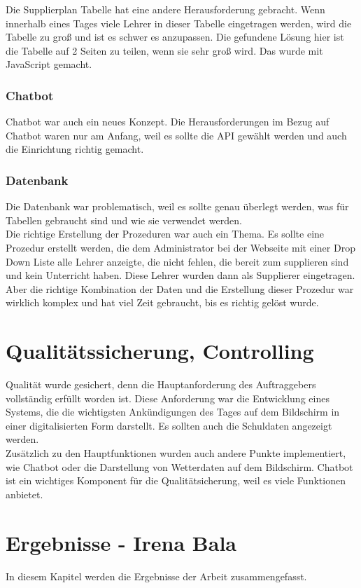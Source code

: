Die Supplierplan Tabelle hat eine andere Herausforderung gebracht. Wenn innerhalb eines Tages viele Lehrer in dieser Tabelle eingetragen werden, wird die Tabelle zu groß und ist es schwer es anzupassen. Die gefundene Lösung hier ist die Tabelle auf 2 Seiten zu teilen, wenn sie sehr groß wird. Das wurde mit JavaScript gemacht. 

\subsubsection{Chatbot}

Chatbot war auch ein neues Konzept. Die Herausforderungen im Bezug auf Chatbot waren nur am Anfang, weil es sollte die API gewählt werden und auch die Einrichtung richtig gemacht. 

\subsubsection{Datenbank}

Die Datenbank war problematisch, weil es sollte genau überlegt werden, was für Tabellen gebraucht sind und wie sie verwendet werden. \\
Die richtige Erstellung der Prozeduren war auch ein Thema. Es sollte eine Prozedur erstellt werden, die dem Administrator bei der Webseite mit einer Drop Down Liste alle Lehrer anzeigte, die nicht fehlen, die bereit zum supplieren sind und kein Unterricht haben. Diese Lehrer wurden dann als Supplierer eingetragen. Aber die richtige Kombination der Daten und die Erstellung dieser Prozedur war wirklich komplex und hat viel Zeit gebraucht, bis es richtig gelöst wurde. 
\section{Qualitätssicherung, Controlling}
Qualität wurde gesichert, denn die Hauptanforderung des Auftraggebers vollständig erfüllt worden ist. Diese Anforderung war die Entwicklung eines Systems, die die wichtigsten Ankündigungen des Tages auf dem Bildschirm in einer digitalisierten Form darstellt. Es sollten auch die Schuldaten angezeigt werden. \\
Zusätzlich zu den Hauptfunktionen wurden auch andere Punkte implementiert, wie Chatbot oder die Darstellung von Wetterdaten auf dem Bildschirm. Chatbot ist ein wichtiges Komponent für die Qualitätsicherung, weil es viele Funktionen anbietet. 

\section{Ergebnisse - Irena Bala}
In diesem Kapitel werden die Ergebnisse der Arbeit zusammengefasst.

